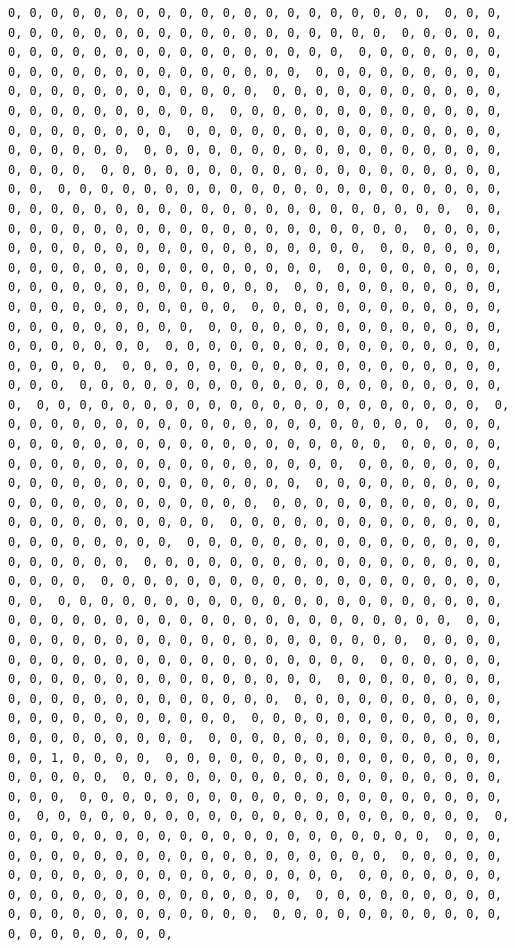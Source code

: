 \documentclass[
]{article}
\begin{document}
\begin{verbatim}
0, 0, 0, 0, 0, 0, 0, 0, 0, 0, 0, 0, 0, 0, 0, 0, 0, 0, 0, 0,  0, 0, 0, 0, 0, 0, 0, 0, 0, 0, 0, 0, 0, 0, 0, 0, 0, 0, 0, 0, 0,  0, 0, 0, 0, 0, 0, 0, 0, 0, 0, 0, 0, 0, 0, 0, 0, 0, 0, 0, 0, 0,  0, 0, 0, 0, 0, 0, 0, 0, 0, 0, 0, 0, 0, 0, 0, 0, 0, 0, 0, 0, 0,  0, 0, 0, 0, 0, 0, 0, 0, 0, 0, 0, 0, 0, 0, 0, 0, 0, 0, 0, 0, 0,  0, 0, 0, 0, 0, 0, 0, 0, 0, 0, 0, 0, 0, 0, 0, 0, 0, 0, 0, 0, 0,  0, 0, 0, 0, 0, 0, 0, 0, 0, 0, 0, 0, 0, 0, 0, 0, 0, 0, 0, 0, 0,  0, 0, 0, 0, 0, 0, 0, 0, 0, 0, 0, 0, 0, 0, 0, 0, 0, 0, 0, 0, 0,  0, 0, 0, 0, 0, 0, 0, 0, 0, 0, 0, 0, 0, 0, 0, 0, 0, 0, 0, 0, 0,  0, 0, 0, 0, 0, 0, 0, 0, 0, 0, 0, 0, 0, 0, 0, 0, 0, 0, 0, 0, 0,  0, 0, 0, 0, 0, 0, 0, 0, 0, 0, 0, 0, 0, 0, 0, 0, 0, 0, 0, 0, 0,  0, 0, 0, 0, 0, 0, 0, 0, 0, 0, 0, 0, 0, 0, 0, 0, 0, 0, 0, 0, 0,  0, 0, 0, 0, 0, 0, 0, 0, 0, 0, 0, 0, 0, 0, 0, 0, 0, 0, 0, 0, 0,  0, 0, 0, 0, 0, 0, 0, 0, 0, 0, 0, 0, 0, 0, 0, 0, 0, 0, 0, 0, 0,  0, 0, 0, 0, 0, 0, 0, 0, 0, 0, 0, 0, 0, 0, 0, 0, 0, 0, 0, 0, 0,  0, 0, 0, 0, 0, 0, 0, 0, 0, 0, 0, 0, 0, 0, 0, 0, 0, 0, 0, 0, 0,  0, 0, 0, 0, 0, 0, 0, 0, 0, 0, 0, 0, 0, 0, 0, 0, 0, 0, 0, 0, 0,  0, 0, 0, 0, 0, 0, 0, 0, 0, 0, 0, 0, 0, 0, 0, 0, 0, 0, 0, 0, 0,  0, 0, 0, 0, 0, 0, 0, 0, 0, 0, 0, 0, 0, 0, 0, 0, 0, 0, 0, 0, 0,  0, 0, 0, 0, 0, 0, 0, 0, 0, 0, 0, 0, 0, 0, 0, 0, 0, 0, 0, 0, 0,  0, 0, 0, 0, 0, 0, 0, 0, 0, 0, 0, 0, 0, 0, 0, 0, 0, 0, 0, 0, 0,  0, 0, 0, 0, 0, 0, 0, 0, 0, 0, 0, 0, 0, 0, 0, 0, 0, 0, 0, 0, 0,  0, 0, 0, 0, 0, 0, 0, 0, 0, 0, 0, 0, 0, 0, 0, 0, 0, 0, 0, 0, 0,  0, 0, 0, 0, 0, 0, 0, 0, 0, 0, 0, 0, 0, 0, 0, 0, 0, 0, 0, 0, 0,  0, 0, 0, 0, 0, 0, 0, 0, 0, 0, 0, 0, 0, 0, 0, 0, 0, 0, 0, 0, 0,  0, 0, 0, 0, 0, 0, 0, 0, 0, 0, 0, 0, 0, 0, 0, 0, 0, 0, 0, 0, 0,  0, 0, 0, 0, 0, 0, 0, 0, 0, 0, 0, 0, 0, 0, 0, 0, 0, 0, 0, 0, 0,  0, 0, 0, 0, 0, 0, 0, 0, 0, 0, 0, 0, 0, 0, 0, 0, 0, 0, 0, 0, 0,  0, 0, 0, 0, 0, 0, 0, 0, 0, 0, 0, 0, 0, 0, 0, 0, 0, 0, 0, 0, 0,  0, 0, 0, 0, 0, 0, 0, 0, 0, 0, 0, 0, 0, 0, 0, 0, 0, 0, 0, 0, 0,  0, 0, 0, 0, 0, 0, 0, 0, 0, 0, 0, 0, 0, 0, 0, 0, 0, 0, 0, 0, 0,  0, 0, 0, 0, 0, 0, 0, 0, 0, 0, 0, 0, 0, 0, 0, 0, 0, 0, 0, 0, 0,  0, 0, 0, 0, 0, 0, 0, 0, 0, 0, 0, 0, 0, 0, 0, 0, 0, 0, 0, 0, 0,  0, 0, 0, 0, 0, 0, 0, 0, 0, 0, 0, 0, 0, 0, 0, 0, 0, 0, 0, 0, 0,  0, 0, 0, 0, 0, 0, 0, 0, 0, 0, 0, 0, 0, 0, 0, 0, 0, 0, 0, 0, 0,  0, 0, 0, 0, 0, 0, 0, 0, 0, 0, 0, 0, 0, 0, 0, 0, 0, 0, 0, 0, 0,  0, 0, 0, 0, 0, 0, 0, 0, 0, 0, 0, 0, 0, 0, 0, 0, 0, 0, 0, 0, 0,  0, 0, 0, 0, 0, 0, 0, 0, 0, 0, 0, 0, 0, 0, 0, 0, 0, 0, 0, 0, 0,  0, 0, 0, 0, 0, 0, 0, 0, 0, 0, 0, 0, 0, 0, 0, 0, 0, 0, 0, 0, 0,  0, 0, 0, 0, 0, 0, 0, 0, 0, 0, 0, 0, 0, 0, 0, 0, 0, 0, 0, 0, 0,  0, 0, 0, 0, 0, 0, 0, 0, 0, 0, 0, 0, 0, 0, 0, 0, 0, 0, 0, 0, 0,  0, 0, 0, 0, 0, 0, 0, 0, 0, 0, 0, 0, 0, 0, 0, 0, 1, 0, 0, 0, 0,  0, 0, 0, 0, 0, 0, 0, 0, 0, 0, 0, 0, 0, 0, 0, 0, 0, 0, 0, 0, 0,  0, 0, 0, 0, 0, 0, 0, 0, 0, 0, 0, 0, 0, 0, 0, 0, 0, 0, 0, 0, 0,  0, 0, 0, 0, 0, 0, 0, 0, 0, 0, 0, 0, 0, 0, 0, 0, 0, 0, 0, 0, 0,  0, 0, 0, 0, 0, 0, 0, 0, 0, 0, 0, 0, 0, 0, 0, 0, 0, 0, 0, 0, 0,  0, 0, 0, 0, 0, 0, 0, 0, 0, 0, 0, 0, 0, 0, 0, 0, 0, 0, 0, 0, 0,  0, 0, 0, 0, 0, 0, 0, 0, 0, 0, 0, 0, 0, 0, 0, 0, 0, 0, 0, 0, 0,  0, 0, 0, 0, 0, 0, 0, 0, 0, 0, 0, 0, 0, 0, 0, 0, 0, 0, 0, 0, 0,  0, 0, 0, 0, 0, 0, 0, 0, 0, 0, 0, 0, 0, 0, 0, 0, 0, 0, 0, 0, 0,  0, 0, 0, 0, 0, 0, 0, 0, 0, 0, 0, 0, 0, 0, 0, 0, 0, 0, 0, 0, 0,  0, 0, 0, 0, 0, 0, 0, 0, 0, 0, 0, 0, 0, 0, 0, 0, 0, 0, 0, 
\end{verbatim}
\end{document}
